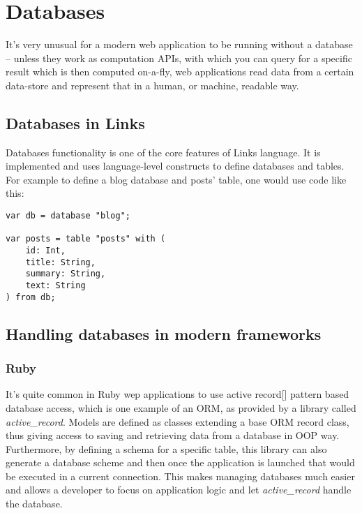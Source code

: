 
\chapter{Databases}

It's very unusual for a modern web application to be running without a database – unless they work as computation APIs, with which you can query for a specific result which is then computed on-a-fly, web applications read data from a certain data-store and represent that in a human, or machine, readable way.

\section{Databases in Links}

Databases functionality is one of the core features of Links language. It is implemented and uses language-level constructs to define databases and tables. For example to define a blog database and posts' table, one would use code like this:

\begin{codelisting}
\begin{verbatim}
var db = database "blog"; 

var posts = table "posts" with ( 
    id: Int, 
    title: String, 
    summary: String, 
    text: String 
) from db;
\end{verbatim}
\end{codelisting}

\section{Handling databases in modern frameworks}

\subsection{Ruby}

It's quite common in Ruby wep applications to use active record[] pattern based database access, which is one example of an ORM, as provided by a library called \textit{active\_record}. Models are defined as classes extending a base ORM record class, thus giving access to saving and retrieving data from a database in OOP way. Furthermore, by defining a schema for a specific table, this library can also generate a database scheme and then once the application is launched that would be executed in a current connection. This makes managing databases much easier and allows a developer to focus on application logic and let \textit{active\_record} handle the database.


